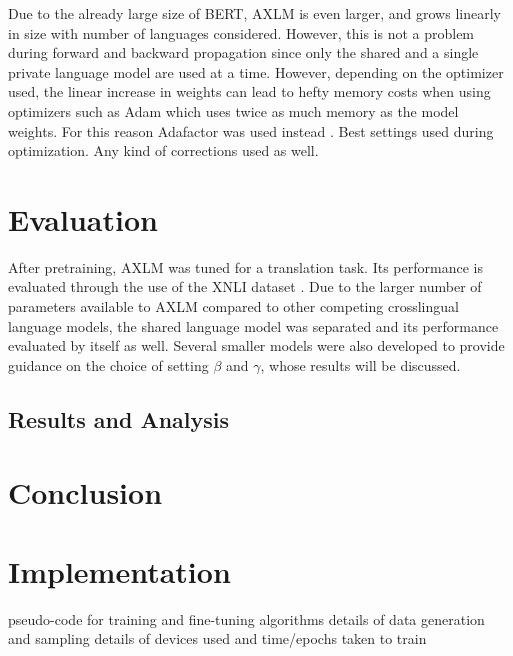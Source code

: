 \documentclass[10pt,letterpaper,twocolumn]{article}
\begin{document}
Due to the already large size of BERT, AXLM is even larger, and grows linearly in size with number of languages considered.  However, this is not a problem during forward and backward propagation since only the shared and a single private language model are used at a time.  However, depending on the optimizer used, the linear increase in weights can lead to hefty memory costs when using optimizers such as Adam which uses twice as much memory as the model weights.  For this reason Adafactor was used instead \cite{}.  Best settings used during optimization.  Any kind of corrections used as well.

\section{Evaluation}
After pretraining, AXLM was tuned for a translation task.  Its performance is evaluated through the use of the XNLI dataset \cite{}.  Due to the larger number of parameters available to AXLM compared to other competing crosslingual language models, the shared language model was separated and its performance evaluated by itself as well.  Several smaller models were also developed to provide guidance on the choice of setting $\beta$ and $\gamma$, whose results will be discussed.

\subsection{Results and Analysis}

\section{Conclusion}

\nocite{*}



\section{Implementation}
pseudo-code for training and fine-tuning algorithms
details of data generation and sampling
details of devices used and time/epochs taken to train
\end{document}
